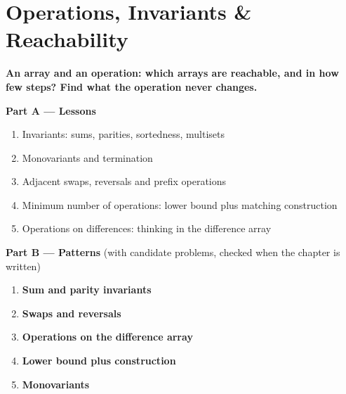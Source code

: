 \chapter{Operations, Invariants \& Reachability}
\label{ch:operations}

\begin{tcolorbox}[enhanced, colback=white, colframe=secondaryblue, boxrule=1pt, arc=2mm]
\textbf{\large\textcolor{primaryblue}{An array and an operation: which arrays are reachable, and in how few steps? Find what the operation never changes.}}
\end{tcolorbox}


\begin{plannedbox}
\textbf{Part A --- Lessons}
\begin{enumerate}[leftmargin=*, label=\textbf{A\arabic*.}, itemsep=1pt]
    \item Invariants: sums, parities, sortedness, multisets
    \item Monovariants and termination
    \item Adjacent swaps, reversals and prefix operations
    \item Minimum number of operations: lower bound plus matching construction
    \item Operations on differences: thinking in the difference array
\end{enumerate}
\textbf{Part B --- Patterns} (with candidate problems, checked when the chapter is written)
\begin{enumerate}[leftmargin=*, label=\textbf{P\arabic*.}, itemsep=1pt]
    \item \textbf{Sum and parity invariants}
    \item \textbf{Swaps and reversals}
    \item \textbf{Operations on the difference array}
    \item \textbf{Lower bound plus construction}
    \item \textbf{Monovariants}
\end{enumerate}
\end{plannedbox}
